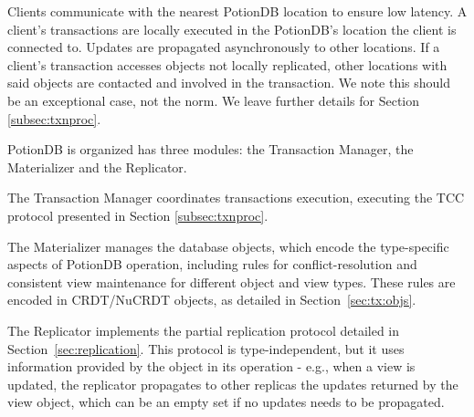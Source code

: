 \documentclass[sigplan,twocolumn,review,anonymous]{acmart}
\newcommand{\nuno}[1]{\nbnote{Nuno}{red}{#1}}
\begin{document}
Clients communicate with the nearest PotionDB location to ensure low latency.
A client's transactions are locally executed in the PotionDB's location the client is connected to.
Updates are propagated asynchronously to other locations.
If a client's transaction accesses objects not locally replicated, other locations with said objects are contacted and involved in the transaction.
We note this should be an exceptional case, not the norm.
We leave further details for Section \ref{subsec:txnproc}.

PotionDB is organized has three modules: the Transaction Manager, the Materializer and 
the Replicator.

The Transaction Manager coordinates transactions execution, executing the TCC protocol presented in Section \ref{subsec:txnproc}.

The Materializer manages the database objects, which encode the type-specific
aspects of PotionDB operation, including rules for conflict-resolution and consistent view 
maintenance for different object and view types. These rules are encoded in CRDT/NuCRDT objects, 
as detailed in Section~\ref{sec:tx:objs}.

The Replicator implements the partial replication protocol detailed in Section~\ref{sec:replication}.
This protocol is type-independent, but it uses information provided by the object in its operation - e.g., 
when a view  is updated, the replicator propagates to other replicas the updates returned by the
view object, which can be an empty set if no updates needs to be propagated.


%
%
%
\end{document}
